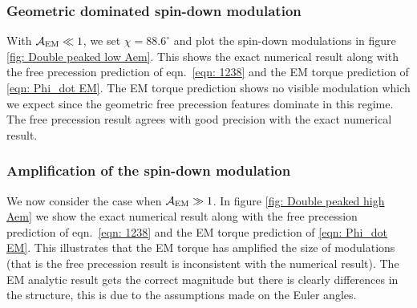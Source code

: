 \documentclass[/home/greg/Thesis/main/main.tex]{subfiles}
\begin{document}
\subsubsection{Geometric dominated spin-down modulation}
With $\mathcal{A}_{\mathrm{EM}} \ll 1$, we set $\chi=88.6^{\circ}$ and plot the spin-down modulations
in figure \ref{fig: Double peaked low Aem}. This shows the exact numerical 
result along with the free precession prediction of eqn.~\eqref{eqn: 1238} and
the EM torque prediction of \eqref{eqn: Phi_dot EM}. The EM torque 
prediction shows no visible modulation which we expect since the geometric 
free precession features dominate in this regime. The free precession result
agrees with good precision with the exact numerical result.
\begin{figure}[htb]
\begin{floatrow}
\capbtabbox{%
    
}{%
  \caption{}%
  \label{tab: Double peaked low Aem}
}
\end{floatrow}
\end{figure}

\subsubsection{Amplification of the spin-down modulation}

We now consider the case when $\mathcal{A}_{\mathrm{EM}} \gg 1$. In figure \ref{fig: Double peaked
high Aem} we show the exact numerical result along with the free precession
prediction of eqn.~\eqref{eqn: 1238} and the EM torque prediction of
\eqref{eqn: Phi_dot EM}. This illustrates that the EM torque has amplified
the size of modulations (that is the free precession result is inconsistent
with the numerical result). The EM analytic result gets the correct magnitude
but there is clearly differences in the structure, this is due to the assumptions
made on the Euler angles.

\begin{figure}[htb]
\begin{floatrow}
\capbtabbox{%
    
}{%
  \caption{}%
  \label{tab: Double peaked high Aem}
}
\end{floatrow}
\end{figure}





\biblio
\end{document}
